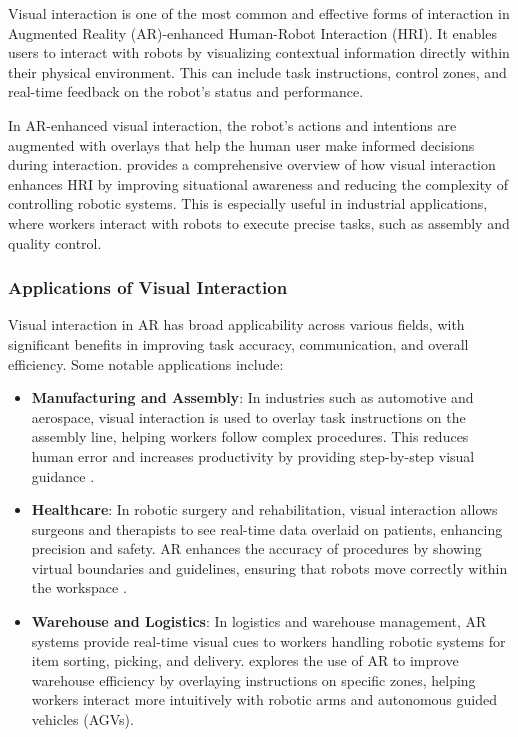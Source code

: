 Visual interaction is one of the most common and effective forms of interaction in Augmented Reality (AR)-enhanced Human-Robot Interaction (HRI). It enables users to interact with robots by visualizing contextual information directly within their physical environment. This can include task instructions, control zones, and real-time feedback on the robot's status and performance.

In AR-enhanced visual interaction, the robot's actions and intentions are augmented with overlays that help the human user make informed decisions during interaction. \cite{Suzuki2022} provides a comprehensive overview of how visual interaction enhances HRI by improving situational awareness and reducing the complexity of controlling robotic systems. This is especially useful in industrial applications, where workers interact with robots to execute precise tasks, such as assembly and quality control.

\subsubsection{Applications of Visual Interaction}

Visual interaction in AR has broad applicability across various fields, with significant benefits in improving task accuracy, communication, and overall efficiency. Some notable applications include:
\begin{itemize}
    \item \textbf{Manufacturing and Assembly}: In industries such as automotive and aerospace, visual interaction is used to overlay task instructions on the assembly line, helping workers follow complex procedures. This reduces human error and increases productivity by providing step-by-step visual guidance \cite{Daponte2020}.
    \item \textbf{Healthcare}: In robotic surgery and rehabilitation, visual interaction allows surgeons and therapists to see real-time data overlaid on patients, enhancing precision and safety. AR enhances the accuracy of procedures by showing virtual boundaries and guidelines, ensuring that robots move correctly within the workspace \cite{Husar2022}.
    \item \textbf{Warehouse and Logistics}: In logistics and warehouse management, AR systems provide real-time visual cues to workers handling robotic systems for item sorting, picking, and delivery. \cite{Husar2022} explores the use of AR to improve warehouse efficiency by overlaying instructions on specific zones, helping workers interact more intuitively with robotic arms and autonomous guided vehicles (AGVs).
\end{itemize}

